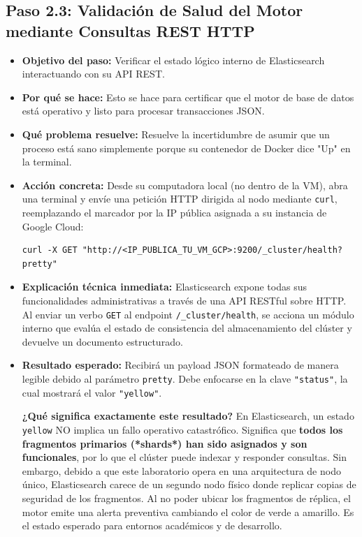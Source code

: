 \documentclass[
  coursetitle={Cómputo Nube y Tecnologías Emergentes},
  coursehours={96},
  coursedate={Verano 2026},
  doctype={Guía de Laboratorio Práctico},
  otherlangs={english,french},
  authorname={Lázaro},
  authorsurname={Bustio-Martínez},
  authortitle={PhD},
  role={Profesor Investigador},
  email={lbustio@inaoe.mx},
  phone={5559504000},
  ext={7459},
  institution={Instituto Nacional de Astrofísica, Óptica y Electrónica (INAOE)},
  department={Maestría en Ciencias en Tecnologías de Seguridad},
  address={Luis Enrique Erro 1, Sta. Ma. Tonantzintla, San Andrés Cholula, CP 72840, Puebla, México},
  margin={0.5in}
]{../../lbustio_lecture_notes}
\begin{document}
\subsection{Paso 2.3: Validación de Salud del Motor mediante Consultas REST HTTP}

\begin{itemize}
    \item \textbf{Objetivo del paso:} Verificar el estado lógico interno de Elasticsearch interactuando con su API REST.
    \item \textbf{Por qué se hace:} Esto se hace para certificar que el motor de base de datos está operativo y listo para procesar transacciones JSON.
    \item \textbf{Qué problema resuelve:} Resuelve la incertidumbre de asumir que un proceso está sano simplemente porque su contenedor de Docker dice "Up" en la terminal.
    \item \textbf{Acción concreta:} Desde su computadora local (no dentro de la VM), abra una terminal y envíe una petición HTTP dirigida al nodo mediante \texttt{curl}, reemplazando el marcador por la IP pública asignada a su instancia de Google Cloud:
    
\begin{verbatim}
curl -X GET "http://<IP_PUBLICA_TU_VM_GCP>:9200/_cluster/health?pretty"
\end{verbatim}

    \item \textbf{Explicación técnica inmediata:} Elasticsearch expone todas sus funcionalidades administrativas a través de una API RESTful sobre HTTP. Al enviar un verbo \texttt{GET} al endpoint \texttt{/\_cluster/health}, se acciona un módulo interno que evalúa el estado de consistencia del almacenamiento del clúster y devuelve un documento estructurado.
    
    \item \textbf{Resultado esperado:} Recibirá un payload JSON formateado de manera legible debido al parámetro \texttt{pretty}. Debe enfocarse en la clave \texttt{"status"}, la cual mostrará el valor \texttt{"yellow"}.
    
    \begin{tcolorbox}[title=Interpretación Pedagógica del Estado "Yellow"]
    \textbf{¿Qué significa exactamente este resultado?} En Elasticsearch, un estado \texttt{yellow} NO implica un fallo operativo catastrófico. Significa que \textbf{todos los fragmentos primarios (*shards*) han sido asignados y son funcionales}, por lo que el clúster puede indexar y responder consultas. Sin embargo, debido a que este laboratorio opera en una arquitectura de nodo único, Elasticsearch carece de un segundo nodo físico donde replicar copias de seguridad de los fragmentos. Al no poder ubicar los fragmentos de réplica, el motor emite una alerta preventiva cambiando el color de verde a amarillo. Es el estado esperado para entornos académicos y de desarrollo.
    \end{tcolorbox}
    

\end{itemize}
\end{document}
